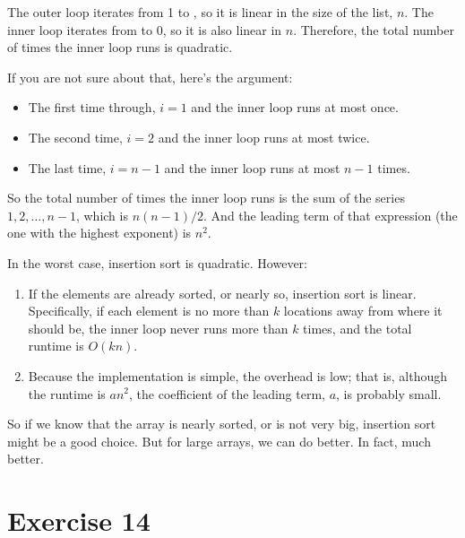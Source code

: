 \documentclass[12pt]{book}
\theoremstyle{exercise}
\begin{document}

The outer loop iterates from 1 to , so it is linear
in the size of the list, $n$.
The inner loop iterates from  to 0, so it is also linear in $n$.
Therefore, the total number of times the inner loop runs is quadratic.


If you are not sure about that, here's the argument:

\begin{itemize}

\item
  The first time through, $i=1$ and the inner loop runs at most
  once.

\item
  The second time, $i=2$ and the inner loop runs at most twice.

\item
  The last time, $i=n-1$ and the inner loop runs at most
  $n-1$ times.

\end{itemize}

So the total number of times the inner loop runs is the sum of the
series $1, 2, \ldots , n-1$, which is $n (n-1) / 2$. And the
leading term of that expression (the one with the highest exponent) is
$n^2$.


In the worst case, insertion sort is quadratic. However:

\begin{enumerate}

\item
  If the elements are already sorted, or nearly so, insertion sort is
  linear. Specifically, if each element is no more than $k$
  locations away from where it should be, the inner loop never runs more
  than $k$ times, and the total runtime is $O(kn)$.

\item
  Because the implementation is simple, the overhead is low; that is,
  although the runtime is $a n^2$, the coefficient of the leading
  term, $a$, is probably small.

\end{enumerate}

So if we know that the array is nearly sorted, or is not very big,
insertion sort might be a good choice. But for large arrays, we can
do better. In fact, much better.


\section{Exercise 14}
\label{exercise14}
\end{document}
